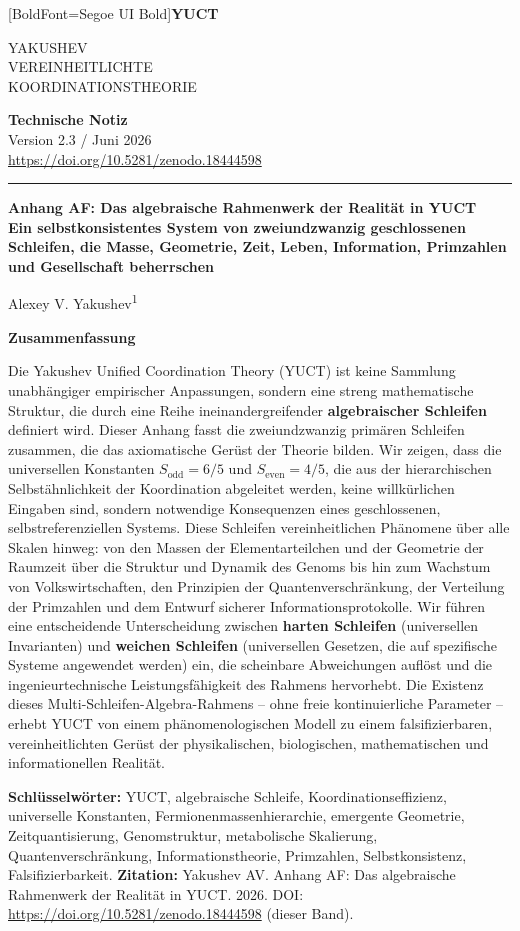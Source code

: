 \documentclass[12pt,a4paper]{article}
\newcommand{\makeheader}{%
	\noindent
	\begin{minipage}{0.17\textwidth}
		\raggedright
		{\fontspec{Segoe UI}[BoldFont=Segoe UI Bold]\bfseries\color{skyblue}\fontsize{46}{46}\selectfont YUCT}%
	\end{minipage}%
	\hspace{30pt}
	\begin{minipage}{0.32\textwidth}
		\raggedright
		{\sffamily\fontsize{11}{13}\selectfont YAKUSHEV\\ VEREINHEITLICHTE\\ KOORDINATIONSTHEORIE}%
	\end{minipage}%
	\hfill
	\begin{minipage}{0.38\textwidth}
		\raggedleft
		{\sffamily\bfseries Technische Notiz}\\ 
		{\sffamily Version 2.3 / Juni 2026}\\ 
		{\sffamily\footnotesize \mbox{\url{https://doi.org/10.5281/zenodo.18444598}}}%
	\end{minipage}
	\par\vspace{5pt}
	\noindent\textcolor{gold}{\rule{\textwidth}{1.6pt}}
	\par\vspace{0pt}
}
\begin{document}
	
	\thispagestyle{firstpage}
	\makeheader
	
	\vspace{0cm}
	{\LARGE\bfseries Anhang AF: Das algebraische Rahmenwerk der Realität in YUCT \\ 
		\Large Ein selbstkonsistentes System von zweiundzwanzig geschlossenen Schleifen, die Masse, Geometrie, Zeit, Leben, Information, Primzahlen und Gesellschaft beherrschen \par}
	\vspace{0.2cm}
	
	{\large Alexey V. Yakushev\textsuperscript{1}} \\
	\vspace{0.0cm}
	
	{\color{darkblue}\textbf{\LARGE Zusammenfassung}} \par
	{\large
		\noindent
		Die Yakushev Unified Coordination Theory (YUCT) ist keine Sammlung unabhängiger empirischer Anpassungen, sondern eine streng mathematische Struktur, die durch eine Reihe ineinandergreifender \textbf{algebraischer Schleifen} definiert wird. Dieser Anhang fasst die zweiundzwanzig primären Schleifen zusammen, die das axiomatische Gerüst der Theorie bilden. Wir zeigen, dass die universellen Konstanten \(S_{\mathrm{odd}} = 6/5\) und \(S_{\mathrm{even}} = 4/5\), die aus der hierarchischen Selbstähnlichkeit der Koordination abgeleitet werden, keine willkürlichen Eingaben sind, sondern notwendige Konsequenzen eines geschlossenen, selbstreferenziellen Systems. Diese Schleifen vereinheitlichen Phänomene über alle Skalen hinweg: von den Massen der Elementarteilchen und der Geometrie der Raumzeit über die Struktur und Dynamik des Genoms bis hin zum Wachstum von Volkswirtschaften, den Prinzipien der Quantenverschränkung, der Verteilung der Primzahlen und dem Entwurf sicherer Informationsprotokolle. Wir führen eine entscheidende Unterscheidung zwischen \textbf{harten Schleifen} (universellen Invarianten) und \textbf{weichen Schleifen} (universellen Gesetzen, die auf spezifische Systeme angewendet werden) ein, die scheinbare Abweichungen auflöst und die ingenieurtechnische Leistungsfähigkeit des Rahmens hervorhebt. Die Existenz dieses Multi-Schleifen-Algebra-Rahmens – ohne freie kontinuierliche Parameter – erhebt YUCT von einem phänomenologischen Modell zu einem falsifizierbaren, vereinheitlichten Gerüst der physikalischen, biologischen, mathematischen und informationellen Realität.}
	
	\vspace{0.1cm}
	\noindent
	{\color{darkblue}\textbf{Schlüsselwörter:}} YUCT, algebraische Schleife, Koordinationseffizienz, universelle Konstanten, Fermionenmassenhierarchie, emergente Geometrie, Zeitquantisierung, Genomstruktur, metabolische Skalierung, Quantenverschränkung, Informationstheorie, Primzahlen, Selbstkonsistenz, Falsifizierbarkeit.
	\vspace{0.1cm}
	\noindent
	{\color{darkblue}\textbf{Zitation:}} Yakushev AV. Anhang AF: Das algebraische Rahmenwerk der Realität in YUCT. 2026. DOI: \url{https://doi.org/10.5281/zenodo.18444598} (dieser Band).
	
\end{document}
